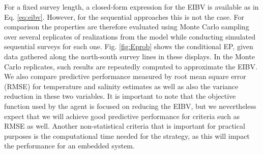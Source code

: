 For a fixed survey length, a closed-form expression for the EIBV is
available as in Eq. \eqref{eq:eibv}. However, for the sequential
approaches this is not the case. For comparison the properties are
therefore evaluated using Monte Carlo sampling over several replicates
of realizations from the model while conducting simulated sequential
surveys for each one. Fig. \ref{fig:Eprob} shows the conditional EP,
given data gathered along the north-south survey lines in these
displays. In the Monte Carlo replicates, such results are repeatedly
computed to approximate the EIBV. We also compare predictive
performance measured by root mean square error (RMSE) for temperature
and salinity estimates as well as also the variance reduction in these
two variables. It is important to note that the objective function
used by the agent  is focused on reducing the
EIBV, but we nevertheless expect that we will achieve good predictive
performance for criteria such as RMSE as well. Another non-statistical
criteria that is important for practical purposes is the computational
time needed for the strategy, as this will impact the performance for
an embedded system.


